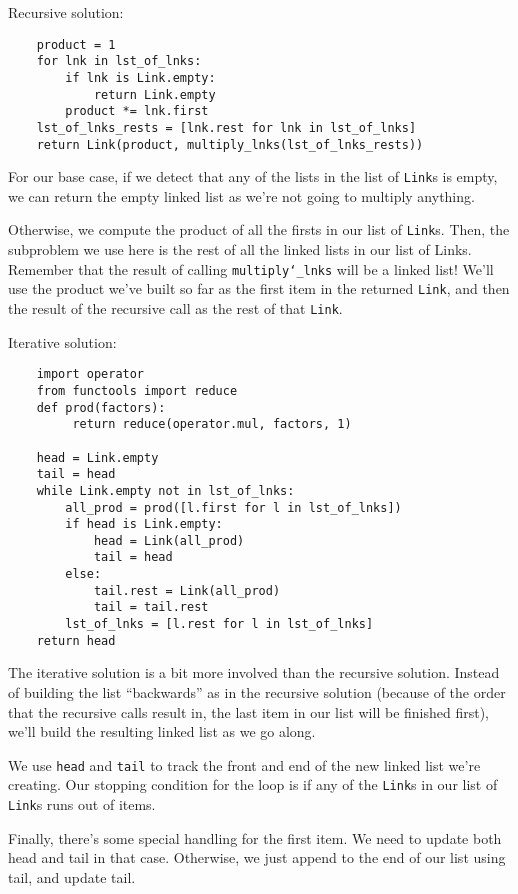 \begin{solution}[1.0in]
Recursive solution:
\begin{lstlisting}
    product = 1
    for lnk in lst_of_lnks:
        if lnk is Link.empty:
            return Link.empty
        product *= lnk.first
    lst_of_lnks_rests = [lnk.rest for lnk in lst_of_lnks]
    return Link(product, multiply_lnks(lst_of_lnks_rests))
\end{lstlisting}
For our base case, if we detect that any of the lists in the list of
\texttt{Link}s is empty, we can return the empty linked list as we're not going
to multiply anything.

Otherwise, we compute the product of all the firsts in our list of
\texttt{Link}s. Then, the subproblem we use here is the rest of all the linked
lists in our list of Links. Remember that the result of calling
\texttt{multiply\char`_lnks} will be a linked list! We'll use the product we've
built so far as the first item in the returned \texttt{Link}, and then the
result of the recursive call as the rest of that \texttt{Link}.

Iterative solution:
\begin{lstlisting}
    import operator
    from functools import reduce
    def prod(factors):
         return reduce(operator.mul, factors, 1)

    head = Link.empty
    tail = head
    while Link.empty not in lst_of_lnks:
        all_prod = prod([l.first for l in lst_of_lnks])
        if head is Link.empty:
            head = Link(all_prod)
            tail = head
        else:
            tail.rest = Link(all_prod)
            tail = tail.rest
        lst_of_lnks = [l.rest for l in lst_of_lnks]
    return head
\end{lstlisting}

The iterative solution is a bit more involved than the recursive solution.
Instead of building the list ``backwards'' as in the recursive solution (because
of the order that the recursive calls result in, the last item in our list will
be finished first), we'll build the resulting linked list as we go along.

We use \texttt{head} and \texttt{tail} to track the front and end of the new
linked list we're creating. Our stopping condition for the loop is if any of the
\texttt{Link}s in our list of \texttt{Link}s runs out of items.

Finally, there's some special handling for the first item. We need to update
both head and tail in that case. Otherwise, we just append to the end of our
list using tail, and update tail.
\end{solution}
